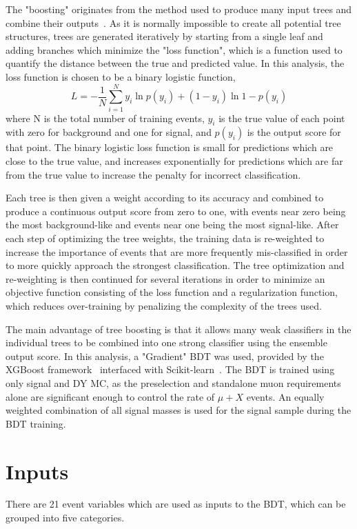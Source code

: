 The "boosting" originates from the method used to produce many input trees and combine their outputs~\cite{GradBoost}. 
As it is normally impossible to create all potential tree structures, trees are generated iteratively by starting from a single leaf and adding branches which minimize the "loss function", which is a function used to quantify the distance between the true and predicted value.
In this analysis, the loss function is chosen to be a binary logistic function,
\begin{equation}
	\label{binLogFunc}
	L = - \frac{1}{N} \sum_{i=1}^{N} y_i \ln{p(y_i)} + (1-y_i) \ln{1-p(y_i)}
\end{equation} 
where N is the total number of training events, $y_i$ is the true value of each point with zero for background and one for signal, and $p(y_i)$ is the output score for that point.
The binary logistic loss function is small for predictions which are close to the true value, and increases exponentially for predictions which are far from the true value to increase the penalty for incorrect classification.

Each tree is then given a weight according to its accuracy and combined to produce a continuous output score from zero to one, with events near zero being the most background-like and events near one being the most signal-like. 
After each step of optimizing the tree weights, the training data is re-weighted to increase the importance of events that are more frequently mis-classified in order to more quickly approach the strongest classification.
The tree optimization and re-weighting is then continued for several iterations in order to minimize an objective function consisting of the loss function and a regularization function, which reduces over-training by penalizing the complexity of the trees used.

The main advantage of tree boosting is that it allows many weak classifiers in the individual trees to be combined into one strong classifier using the ensemble output score.
In this analysis, a "Gradient" BDT was used, provided by the XGBoost framework~\cite{XGBoost} interfaced with Scikit-learn~\cite{scikit}. The BDT is trained using only signal and DY MC, as the preselection and standalone muon requirements alone are significant enough to control the rate of $\mu+X$ events. 
An equally weighted combination of all signal masses is used for the signal sample during the BDT training.

\section{Inputs}
There are 21 event variables which are used as inputs to the BDT, which can be grouped into five categories.

